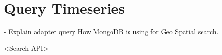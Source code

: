 \section{Query Timeseries}

- Explain adapter query
How MongoDB is using for Geo Spatial search.

<Search API>
